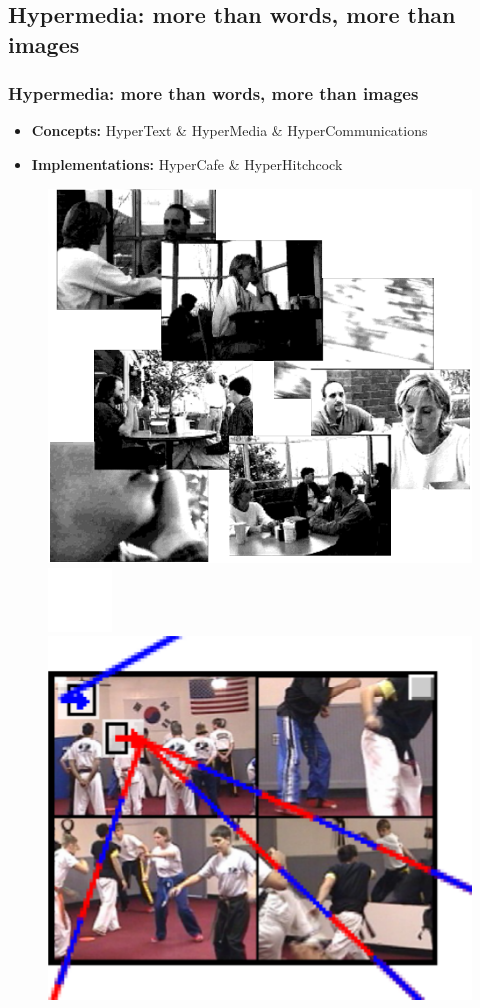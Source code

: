 \documentclass[t]{beamer}
\begin{document}
	\subsection{Hypermedia: more than words, more than images}
  		\begin{frame}[c]
		\frametitle{Hypermedia: more than words, more than images}
		\begin{itemize}
		\item \textbf{Concepts:} HyperText \& HyperMedia \& HyperCommunications
		\vfill
		\item \textbf{Implementations:} HyperCafe \& HyperHitchcock  %
				
		\end{itemize}
		
		\begin{figure}
			\includegraphics[height=0.4\textheight]{figures/hypercafe.png}
						\includegraphics[height=0.1\textheight]{figures/space.png}
			\includegraphics[height=0.4\textheight]{figures/hitchcock.png}

\end{figure}
\end{frame}
\end{document}
